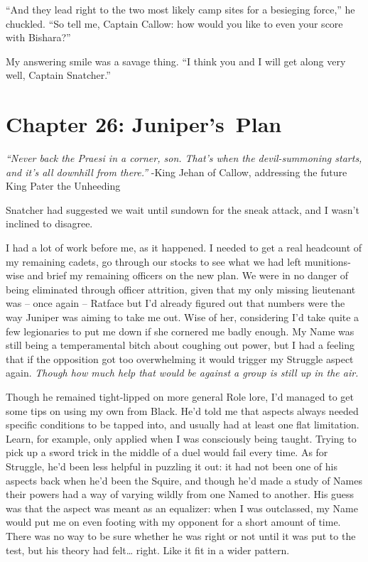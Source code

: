 \documentclass[12pt, openany]{book}
\begin{document}
“And they lead right to the two most likely camp sites for a besieging force,” he chuckled. “So tell me, Captain Callow: how would you like to even your score with Bishara?”

My answering smile was a savage thing. “I think you and I will get along very well, Captain Snatcher.”
\clearpage
\chapter{Chapter 26: Juniper’s Plan}

\textit{“Never back the Praesi in a corner, son. That’s when the devil-summoning starts, and it’s all downhill from there.”}
-King Jehan of Callow, addressing the future King Pater the Unheeding

Snatcher had suggested we wait until sundown for the sneak attack, and I wasn’t inclined to disagree.

I had a lot of work before me, as it happened. I needed to get a real headcount of my remaining cadets, go through our stocks to see what we had left munitions-wise and brief my remaining officers on the new plan. We were in no danger of being eliminated through officer attrition, given that my only missing lieutenant was – once again – Ratface but I’d already figured out that numbers were the way Juniper was aiming to take me out. Wise of her, considering I’d take quite a few legionaries to put me down if she cornered me badly enough. My Name was still being a temperamental bitch about coughing out power, but I had a feeling that if the opposition got too overwhelming it would trigger my Struggle aspect again. \textit{Though how much help that would be against a group is still up in the air. }

Though he remained tight-lipped on more general Role lore, I’d managed to get some tips on using my own from Black. He’d told me that aspects always needed specific conditions to be tapped into, and usually had at least one flat limitation. Learn, for example, only applied when I was consciously being taught. Trying to pick up a sword trick in the middle of a duel would fail every time. As for Struggle, he’d been less helpful in puzzling it out: it had not been one of his aspects back when he’d been the Squire, and though he’d made a study of Names their powers had a way of varying wildly from one Named to another. His guess was that the aspect was meant as an equalizer: when I was outclassed, my Name would put me on even footing with my opponent for a short amount of time. There was no way to be sure whether he was right or not until it was put to the test, but his theory had felt… right. Like it fit in a wider pattern.
\end{document}

